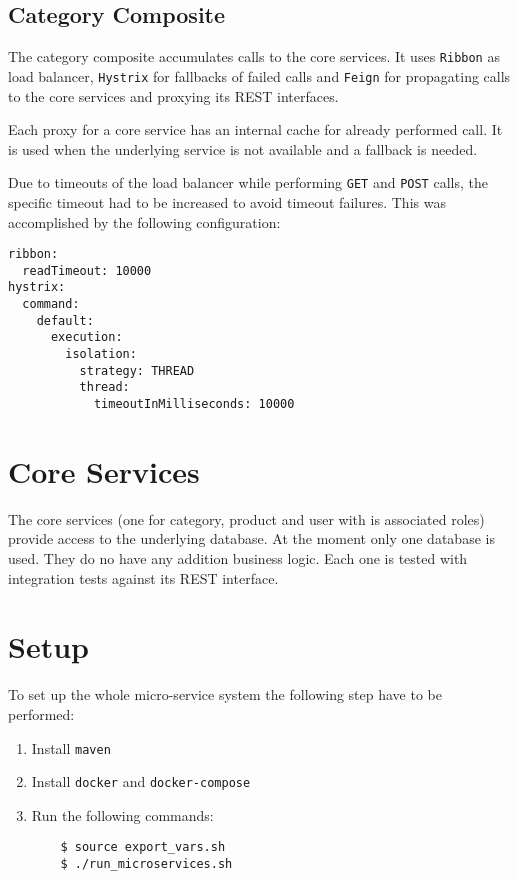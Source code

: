 \documentclass[11pt]{article}
\begin{document}
	\subsection{Category Composite}
	The category composite accumulates calls to the core services. It uses \texttt{Ribbon} as load balancer, \texttt{Hystrix} for fallbacks of failed calls and \texttt{Feign} for propagating calls to the core services and proxying its REST interfaces.
	
	Each proxy for a core service has an internal cache for already performed call. It is used when the underlying service is not available and a fallback is needed.
	
	Due to timeouts of the load balancer while performing \texttt{GET} and \texttt{POST} calls, the specific timeout had to be increased to avoid timeout failures. This was accomplished by the following configuration:
    \begin{lstlisting}
ribbon:
  readTimeout: 10000
hystrix:
  command:
    default:
      execution:
        isolation:
          strategy: THREAD
          thread:
            timeoutInMilliseconds: 10000
    \end{lstlisting}
	\section{Core Services}
	The core services (one for category, product and user with is associated roles) provide access to the underlying database. At the moment only one database is used. They do no have any addition business logic. Each one is tested with integration tests against its REST interface.

   \section{Setup}
   To set up the whole micro-service system the following step have to be performed:
   \begin{enumerate}
   	\item Install \texttt{maven}
   	\item Install \texttt{docker} and \texttt{docker-compose}
   	\item Run the following commands:
	\begin{lstlisting}
	$ source export_vars.sh
	$ ./run_microservices.sh
	\end{lstlisting}
	\end{enumerate}
 
\end{document}
